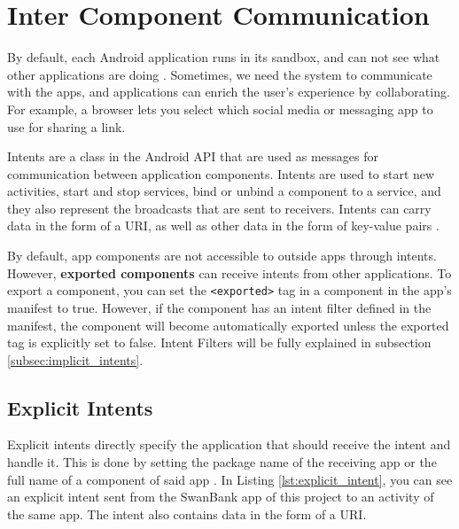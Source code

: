     
    
    \section{Inter Component Communication}
        \label{sec:inter_component_communication}
    
    By default, each Android application runs in its sandbox, and can not see what other applications are doing \cite{android_app_fundamentals}. Sometimes, we need the system to communicate with the apps, and applications can enrich the user's experience by collaborating. For example, a browser lets you select which social media or messaging app to use for sharing a link.
    
    Intents are a class in the Android API that are used as messages for communication between application components. Intents are used to start new activities, start and stop services, bind or unbind a component to a service, and they also represent the broadcasts that are sent to receivers. Intents can carry data in the form of a URI, as well as other data in the form of key-value pairs \cite{intents}.
        
    By default, app components are not accessible to outside apps through intents. However, \textbf{exported components} can receive intents from other applications. To export a component, you can set the \lstinline|<exported>| tag in a component in the app’s manifest to true. However, if the component has an intent filter defined in the manifest, the component will become automatically exported unless the exported tag is explicitly set to false. Intent Filters will be fully explained in subsection \ref{subsec:implicit_intents}.
    
    \subsection{Explicit Intents}
        \label{subsec:explicit_intents}
        
    Explicit intents directly specify the application that should receive the intent and handle it. This is done by setting the package name of the receiving app or the full name of a component of said app \cite{intents_and_intent_filters}. In Listing \ref{lst:explicit_intent}, you can see an explicit intent sent from the SwanBank app of this project to an activity of the same app. The intent also contains data in the form of a URI.
    
